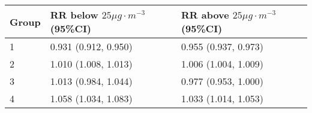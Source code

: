 \begin{tabular}{lll}
  \hline
Group & RR below $25 \mu g \cdot m^{-3}$ (95\%CI) & RR above $25 \mu g \cdot m^{-3}$ (95\%CI) \\ 
  \hline
   1 & 0.931 (0.912, 0.950) & 0.955 (0.937, 0.973) \\ 
     2 & 1.010 (1.008, 1.013) & 1.006 (1.004, 1.009) \\ 
     3 & 1.013 (0.984, 1.044) & 0.977 (0.953, 1.000) \\ 
     4 & 1.058 (1.034, 1.083) & 1.033 (1.014, 1.053) \\ 
   \hline
\end{tabular}

